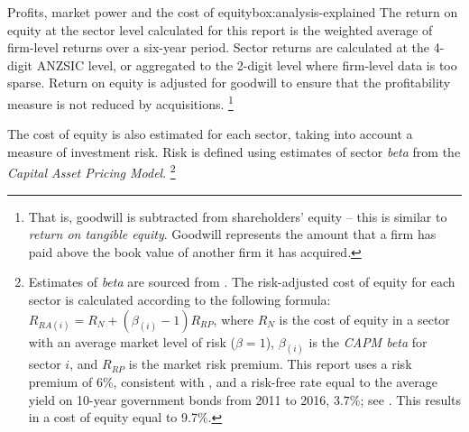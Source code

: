 \begin{bigbox}{Profits, market power and the cost of equity}{box:analysis-explained}
The return on equity at the sector level calculated for this report is the weighted average of firm-level returns over a six-year period. Sector returns are calculated at the 4-digit ANZSIC level, or aggregated to the 2-digit level where firm-level data is too sparse.
Return on equity is adjusted for goodwill to ensure that the profitability measure is not reduced by acquisitions.%
    \footnote{That is, goodwill is subtracted from shareholders' equity -- this is similar to \emph{return on tangible equity}.
    Goodwill represents the amount that a firm has paid above the book value of another firm it has acquired.}

The cost of equity is also estimated for each sector, taking into account a measure of investment risk. Risk is defined using estimates of sector \emph{beta} from the \emph{Capital Asset Pricing Model}.%
    \footnote{Estimates of \emph{beta} are sourced from \textcite{Morningstar2017}. The risk-adjusted cost of equity for each sector is calculated according to the following formula: \(R_{RA(i)} = R_{N} + (\beta_{(i)}-1)R_{RP}\), where \(R_{N}\) is the cost of equity in a sector with an average market level of risk (\(\beta = 1\)), \(\beta_{(i)}\) is the \emph{CAPM beta} for sector \(i\), and \(R_{RP}\) is the market risk premium. This report uses a risk premium of \(6\%\), consistent with \textcite{fernandez2016marketrisk}, and a risk-free rate equal to the average yield on 10-year government bonds from 2011 to 2016, \(3.7\%\); see \textcites{RBA_statistical2017}{RBA_historical2017}. This results in a cost of equity equal to 9.7\(\%\).}
\end{bigbox}

\newpage




